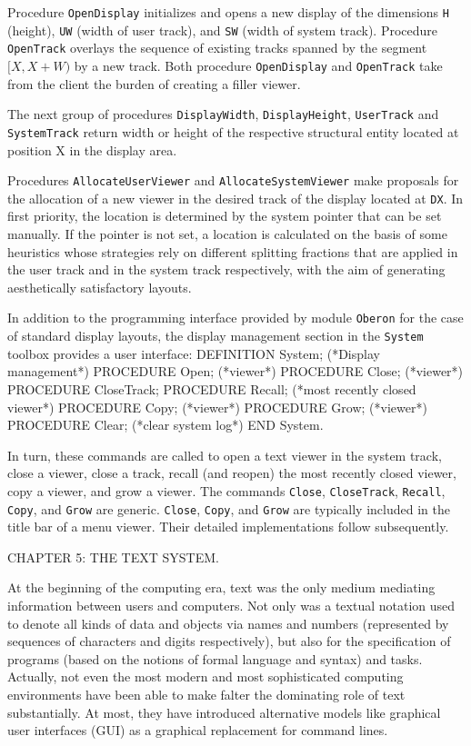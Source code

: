 \noindent Procedure {\tt OpenDisplay\/} initializes and opens a new display of the
dimensions {\tt H\/} (height), {\tt UW\/} (width of user track), and {\tt SW\/} (width of
system track). Procedure {\tt OpenTrack\/} overlays the sequence of existing
tracks spanned by the segment $[X, X + W)$ by a new track. Both
procedure {\tt OpenDisplay\/} and {\tt OpenTrack\/} take from the client the burden
of creating a filler viewer.

The next group of procedures {\tt DisplayWidth\/}, {\tt DisplayHeight\/},
{\tt UserTrack\/} and {\tt SystemTrack\/} return
width or height of the respective structural entity located at
position X in the display area.

Procedures {\tt AllocateUserViewer\/} and {\tt AllocateSystemViewer\/} make proposals
for the allocation of a new viewer in the desired track of the display
located at {\tt DX\/}. In first priority, the location is determined by the
system pointer that can be set manually. If the pointer is not set, a
location is calculated on the basis of some heuristics whose
strategies rely on different splitting fractions that are applied in
the user track and in the system track respectively, with the aim of
generating aesthetically satisfactory layouts.

In addition to the programming interface provided by module {\tt Oberon\/} for
the case of standard display layouts, the display management section
in the {\tt System\/} toolbox provides a user interface:
\begintt
DEFINITION System; (*Display management*)
  PROCEDURE Open; (*viewer*)
  PROCEDURE Close; (*viewer*)
  PROCEDURE CloseTrack;
  PROCEDURE Recall; (*most recently closed viewer*)
  PROCEDURE Copy; (*viewer*)
  PROCEDURE Grow; (*viewer*)
  PROCEDURE Clear; (*clear system log*)
END System.
\endtt

\noindent In turn, these commands are called to open a text viewer in
the system track, close a viewer, close a track, recall (and reopen)
the most recently closed viewer, copy a viewer, and grow a viewer. The
commands {\tt Close\/}, {\tt CloseTrack\/}, {\tt Recall\/}, {\tt Copy\/},
and {\tt Grow\/} are generic. {\tt Close\/}, {\tt Copy\/},
and {\tt Grow\/} are typically included in the title bar of a menu
viewer. Their detailed implementations follow subsequently.

\beginchapter CHAPTER 5: THE TEXT SYSTEM.

At the beginning of the computing era, text was the only medium
mediating information between users and computers. Not only was a
textual notation used to denote all kinds of data and objects via
names and numbers (represented by sequences of characters and digits
respectively), but also for the specification of programs (based on
the notions of formal language and syntax) and tasks. Actually, not
even the most modern and most sophisticated computing environments
have been able to make falter the dominating role of text
substantially. At most, they have introduced alternative models like
graphical user interfaces (GUI) as a graphical replacement for command
lines.


